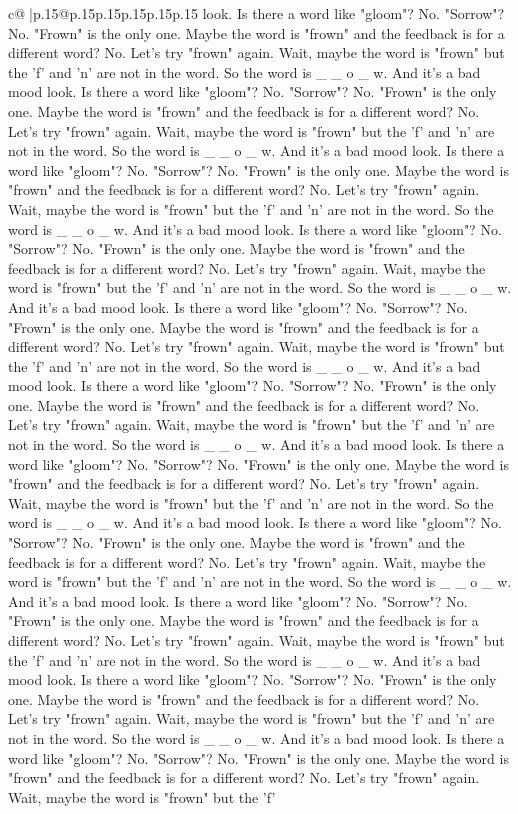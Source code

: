 \documentclass{article}
\begin{document}
{\begin{supertabular}{c@{$\;$}|p{.15\linewidth}@{}p{.15\linewidth}p{.15\linewidth}p{.15\linewidth}p{.15\linewidth}p{.15\linewidth}}
{{{look. Is there a word like "gloom"? No. "Sorrow"? No. "Frown" is the only one. Maybe the word is "frown" and the feedback is for a different word? No. Let's try "frown" again. Wait, maybe the word is "frown" but the 'f' and 'n' are not in the word. So the word is \_ \_ o \_ w. And it's a bad mood look. Is there a word like "gloom"? No. "Sorrow"? No. "Frown" is the only one. Maybe the word is "frown" and the feedback is for a different word? No. Let's try "frown" again. Wait, maybe the word is "frown" but the 'f' and 'n' are not in the word. So the word is \_ \_ o \_ w. And it's a bad mood look. Is there a word like "gloom"? No. "Sorrow"? No. "Frown" is the only one. Maybe the word is "frown" and the feedback is for a different word? No. Let's try "frown" again. Wait, maybe the word is "frown" but the 'f' and 'n' are not in the word. So the word is \_ \_ o \_ w. And it's a bad mood look. Is there a word like "gloom"? No. "Sorrow"? No. "Frown" is the only one. Maybe the word is "frown" and the feedback is for a different word? No. Let's try "frown" again. Wait, maybe the word is "frown" but the 'f' and 'n' are not in the word. So the word is \_ \_ o \_ w. And it's a bad mood look. Is there a word like "gloom"? No. "Sorrow"? No. "Frown" is the only one. Maybe the word is "frown" and the feedback is for a different word? No. Let's try "frown" again. Wait, maybe the word is "frown" but the 'f' and 'n' are not in the word. So the word is \_ \_ o \_ w. And it's a bad mood look. Is there a word like "gloom"? No. "Sorrow"? No. "Frown" is the only one. Maybe the word is "frown" and the feedback is for a different word? No. Let's try "frown" again. Wait, maybe the word is "frown" but the 'f' and 'n' are not in the word. So the word is \_ \_ o \_ w. And it's a bad mood look. Is there a word like "gloom"? No. "Sorrow"? No. "Frown" is the only one. Maybe the word is "frown" and the feedback is for a different word? No. Let's try "frown" again. Wait, maybe the word is "frown" but the 'f' and 'n' are not in the word. So the word is \_ \_ o \_ w. And it's a bad mood look. Is there a word like "gloom"? No. "Sorrow"? No. "Frown" is the only one. Maybe the word is "frown" and the feedback is for a different word? No. Let's try "frown" again. Wait, maybe the word is "frown" but the 'f' and 'n' are not in the word. So the word is \_ \_ o \_ w. And it's a bad mood look. Is there a word like "gloom"? No. "Sorrow"? No. "Frown" is the only one. Maybe the word is "frown" and the feedback is for a different word? No. Let's try "frown" again. Wait, maybe the word is "frown" but the 'f' and 'n' are not in the word. So the word is \_ \_ o \_ w. And it's a bad mood look. Is there a word like "gloom"? No. "Sorrow"? No. "Frown" is the only one. Maybe the word is "frown" and the feedback is for a different word? No. Let's try "frown" again. Wait, maybe the word is "frown" but the 'f' and 'n' are not in the word. So the word is \_ \_ o \_ w. And it's a bad mood look. Is there a word like "gloom"? No. "Sorrow"? No. "Frown" is the only one. Maybe the word is "frown" and the feedback is for a different word? No. Let's try "frown" again. Wait, maybe the word is "frown" but the 'f' }}}
\end{supertabular}}
\end{document}
